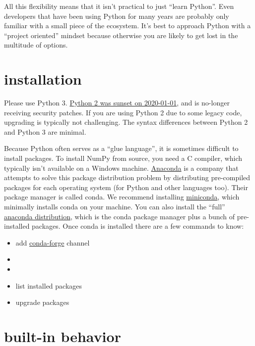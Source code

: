 \documentclass{training}
\begin{document}
All this flexibility means that it isn't practical to just ``learn Python''.
Even developers that have been using Python for many years are probably only familiar with a small piece of the ecosystem.
It's best to approach Python with a ``project oriented'' mindset because otherwise you are likely to get lost in the multitude of options.

\clearpage
\section{installation}

Please use Python 3.
\href{https://www.python.org/doc/sunset-python-2/}{Python 2 was sunset on 2020-01-01}, and is no-longer receiving security patches.
If you are using Python 2 due to some legacy code, upgrading is typically not challenging.
The syntax differences between Python 2 and Python 3 are minimal.

Because Python often serves as a ``glue language'', it is sometimes difficult to install packages.
To install NumPy from source, you need a C compiler, which typically isn't available on a Windows machine.
\href{https://www.anaconda.com/}{Anaconda} is a company that attempts to solve this package distribution problem by distributing pre-compiled packages for each operating system (for Python and other languages too).
Their package manager is called conda.
We recommend installing \href{https://docs.conda.io/en/latest/miniconda.html}{miniconda}, which minimally installs conda on your machine.
You can also install the ``full'' \href{https://www.anaconda.com/distribution/}{anaconda distribution}, which is the conda package manager plus a bunch of pre-installed packages.
Once conda is installed there are a few commands to know:
\begin{itemize}
  \item {} add \href{https://conda-forge.org/}{conda-forge} channel
  \item {}
  \item {}
  \item {} list installed packages
  \item {} upgrade packages
\end{itemize}

\clearpage
\section{built-in behavior}
\end{document}
